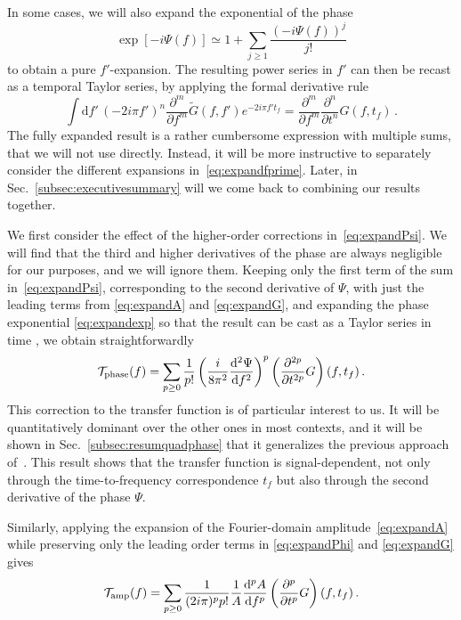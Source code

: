 \documentclass[aps,showpacs,twocolumn,
prd,superscriptaddress,nofootinbib]{revtex4-1}
\newcommand{\be}{\begin{equation}}
\newcommand{\ee}{\end{equation}}
\newcommand\ud{{\mathrm{d}}}
\newcommand\calT{{\mathcal{T}}}
\newcommand{\tf}{t_{f}}
\newcommand{\jgb}[1]{{\color{DarkGreen} #1}}
\begin{document}
\jgb{In some cases, we will also expand the exponential of the phase
\be
\exp\left[ -i\Psi(f) \right] \simeq 1+\sum_{j\geq1}\frac{(-i\Psi(f))^j}{j!}
\label{eq:expandexp}
\ee
to obtain a pure $f'$-expansion. The resulting power series in $f'$ can then be recast as a temporal Taylor series}, by applying the formal derivative rule
\allowdisplaybreaks
\be
	\int \ud f'\, {(-2i\pi f')}^{n} \frac{\partial^{m}}{\partial f^{m}} \tilde{G}(f,f') e^{-2i\pi f' \tf} = \frac{\partial^{m} }{\partial f^{m}} \frac{\partial^{n} }{\partial t^{n}} G (f,\tf) \,.
\ee
The fully expanded result is a rather cumbersome expression with multiple sums, that we will not use directly. Instead, it will be more instructive to separately consider the different expansions in~\eqref{eq:expandfprime}. Later, in Sec.~\ref{subsec:executivesummary} will we come back to combining our results together.

We first consider the effect of the higher-order corrections in~\eqref{eq:expandPsi}. We will find that the third and higher derivatives of the phase are always negligible for our purposes, and we will ignore them. Keeping only the first term of the \jgb{sum in~\eqref{eq:expandPsi}, corresponding to the second derivative of $\Psi$, with just the leading terms from \eqref{eq:expandA} and \eqref{eq:expandG}, and expanding the phase exponential \eqref{eq:expandexp} so that the result can be cast as a Taylor series in time} , we obtain straightforwardly
\be\label{eq:resulttaylorPsi}
	\calT_{\rm phase}(f) = \sum\limits_{p\geq 0} \frac{1}{p!} \left( \frac{i}{8\pi^{2}}\frac{\ud^{2} \Psi}{\ud f^{2}} \right)^{p} \left( \frac{\partial^{2p} }{\partial t^{2p}} G \right)(f, \tf) \,.
\ee
This correction to the transfer function is of particular interest to us. It will be quantitatively dominant over the other ones in most contexts, and it will be shown in Sec.~\ref{subsec:resumquadphase} that it generalizes the previous approach of~\cite{KCY14}. This result shows that the transfer function is signal-dependent, not only through the time-to-frequency correspondence $t_{f}$ but also through the second derivative of the phase $\Psi$.

Similarly, applying the expansion of the Fourier-domain amplitude~\eqref{eq:expandA} while preserving only the leading order terms in \eqref{eq:expandPhi} and \eqref{eq:expandG} gives
\be\label{eq:resulttaylorA}
	\calT_{\rm amp}(f) = \sum\limits_{p\geq 0} \frac{1}{(2i\pi)^{p}p!} \frac{1}{A} \frac{\ud^{p} A}{\ud f ^{p}}  \left( \frac{\partial^{p} }{\partial t^{p}} G \right)(f,\tf) \,.
\ee
\end{document}
